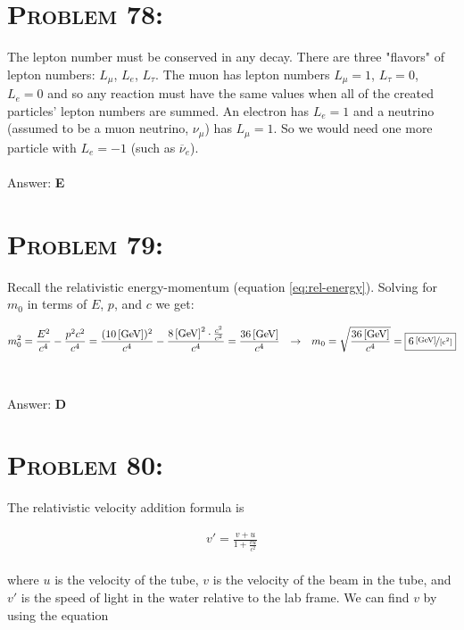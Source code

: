 \documentclass{article}
\begin{document}

\section{\textsc{Problem 78:}} The lepton number must be conserved in any decay. There are three "flavors" of lepton numbers: $L_{\mu}$, $L_{e}$, $L_{\tau}$. The muon has lepton numbers $L_{\mu} = 1$,  $L_{\tau} = 0$, $L_{e} = 0$ and so any reaction must have the same values when all of the created particles' lepton numbers are summed.  An electron has $L_{e} = 1$ and a neutrino (assumed to be a muon neutrino, $\nu_{\mu}$) has $L_{\mu} = 1$. So we would need one more particle with $L_{e} = -1$ (such as $\overline{\nu}_{e}$).
\\\\
Answer: \textbf{\textcolor{ProcessBlue}E}\\


\section{\textsc{Problem 79:}} Recall the relativistic energy-momentum (equation \ref{eq:rel-energy}). Solving for $m_{0}$ in terms of $E$, $p$, and $c$ we get:

\begin{gather}
m_{0}^{2} = \frac{E^{2}}{c^{4}} - \frac{p^{2}c^{2}}{c^{4}} = \frac{(\unit[10]{[GeV]})^{2}}{c^{4}} - \frac{\unit[8]{[GeV]}^{2} \cdot \frac{c^{2}}{c^{2}}}{c^{4}} = \frac{\unit[36]{[GeV]}}{c^{4}} \hspace{.1in} \rightarrow \hspace{.1in} m_{0} = \sqrt{\frac{\unit[36]{[GeV]}}{c^{4}}} = \boxed{\unitfrac[6]{[GeV]}{[c^{2}]}}\nonumber
\end{gather}
\\\\
Answer: \textbf{\textcolor{ProcessBlue}D}\\


\section{\textsc{Problem 80:}} The relativistic velocity addition formula is

\begin{gather}
\label{eq: rel_add} v' = \frac{v+u}{1 +\frac{vu}{c^{2}}}
\end{gather}
\\
where $u$ is the velocity of the tube, $v$ is the velocity of the beam in the tube, and $v'$ is the speed of light in the water relative to the lab frame. We can find $v$ by using the equation
\end{document}
